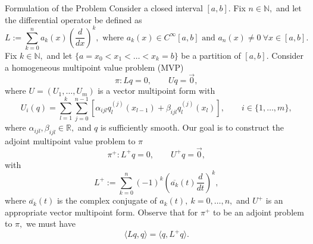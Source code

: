 \documentclass[serif, final, noamsthm]{beamer} %
\begin{document}
\begin{center}
\begin{frame}
\begin{columns}[t]
{
\begin{block}{Formulation of the Problem}
Consider a closed interval $[a,b].$ Fix $n\in\mathbb{N},$ and let the differential operator be defined as
\begin{equation}\label{operatorL}
L  := \sum^n_{k=0} a_k(x)\left( \frac{d}{dx}\right)^k, \mbox{ where } a_k(x) \in C^{\infty}[a,b] \mbox{ and } a_n(x) \neq 0~ \forall x \in [a,b].
\end{equation} 
Fix $k \in \mathbb{N},$ and let $\{ a = x_0 < x_1 < \ldots < x_k = b\}$ be a partition of $[a,b].$ Consider a homogeneous multipoint value problem (MVP)
\[ \pi: Lq = 0, \qquad Uq = \vec{0},\]
where $U = (U_1, \ldots, U_m)$ is a vector multipoint form with 
\begin{equation}\label{MultipointConditions}
U_i(q) = \sum^{k}_{l=1} \sum^{n-1}_{j=0}[\alpha_{ijl} q_l^{(j)}(x_{l-1}) + \beta_{ijl} q_l^{(j)}(x_{l})], \qquad i \in \{ 1, \ldots, m \}, 
\end{equation}
where $\alpha_{ijl}, \beta_{ijl} \in \mathbb{R},$ and $q$ is sufficiently smooth. Our goal is to construct the adjoint multipoint value problem  to $\pi$
\[ 
\pi^+: L^+ q = 0, \qquad U^+q = \vec{0},
\] 
with 
\[ 
L^+  := \sum^n_{k=0} (-1)^k \left( \overline{a_k}(t) \frac{d}{dt}\right)^k,
\]
where $\overline{a_k}(t)$ is the complex conjugate of $a_k(t), ~ k = 0, \ldots, n,$ and $U^+$ is an appropriate vector multipoint form. Observe that for $\pi^+$ to be an adjoint problem to $\pi,$ we must have 
\[ \langle Lq, q \rangle = \langle q, L^+q\rangle. \]
\end{block}

}
\end{columns}
\end{frame}
\end{center}
\end{document}
